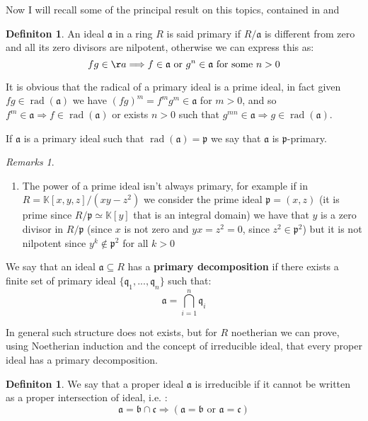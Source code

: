 \documentclass[notitlepage, a4]{book}
\theoremstyle{plain}
\theoremstyle{remark}
\newtheorem{rems}[rem]{Remarks}
\theoremstyle{definition}
\newtheorem{deff}[teo]{Definiton}
\newcommand{\K}{\mathbb{K}}
\newcommand{\p}{\mathfrak{p}}
\newcommand{\q}{\mathfrak{q}}
\newcommand{\A}{\mathfrak{a}}
\newcommand{\B}{\mathfrak{b}}
\newcommand{\Cc}{\mathfrak{c}}
\DeclareMathOperator{\rad}{rad}
\begin{document}
Now I will recall some of the principal result on this topics, contained in \cite[Section 7]{Reid} and \cite[Section 4 and Page 83]{AMCD}

\begin{deff}
	An ideal $ \A $ in a ring $ R $ is said primary if $ R/\A$ is different from zero and all its zero divisors are nilpotent, otherwise we can express this as:
	\begin{equation*}
		fg \in \aa \Longrightarrow f \in \A \text{ or } g^n \in \A \text{ for some } n >0
	\end{equation*}
\end{deff}

It is obvious that the radical of a primary ideal is a prime ideal, in fact given $ fg \in \rad(\A)  $ we have $ (fg)^m = f^m g^m \in \A $ for $ m>0 $, and so $ f^m \in \A \Rightarrow f \in \rad(\A)$ or exists $ n>0 $ such that $ g^{mn} \in \A \Rightarrow g \in \rad(\A) $.

If $ \A $ is a primary ideal such that $ \rad(\A) = \p $ we say that $ \A $ is {$ \p $-primary}.

\begin{rems} \label{rem:power_primary} \quad 
	\begin{enumerate}
	\item The power of a prime ideal isn't always primary, for example if in $ R = \K[x,y,z] / (xy - z^2) $ we consider the prime ideal $ \p = (x,z) $ (it is prime since $ R / \p \simeq \K[y]$ that is an integral domain) we have that $ y $ is a zero divisor in $R/\p $ (since $ x $ is not zero and $ yx = z^2 = 0 $, since $z^2 \in \p^2 $) but it is not nilpotent since $ y^k \not \in \p^2 $ for all $ k>0 $
	\end{enumerate}
\end{rems}

We say that an ideal $ \A \subseteq R $ has a \textbf{primary decomposition}  if there exists a finite set of primary ideal $ \{ \q_1 , ... , \q_n\} $ such that:
\begin{equation*}
	\A = \bigcap_{i=1}^n \q_i
\end{equation*}

In general such structure does not exists, but for $ R $ noetherian we can prove, using Noetherian induction and the concept of irreducible ideal, that every proper ideal has a primary decomposition.

\begin{deff}
	We say that a proper ideal $ \A $ is irreducible if it cannot be written as a proper intersection of ideal, i.e. :
	\begin{equation*}
		\A = \B \cap \Cc \Longrightarrow (\A = \B \text{ or } \A = \Cc)
	\end{equation*}
\end{deff}
\end{document}
